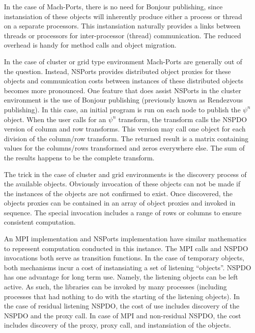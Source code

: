 \documentclass[11pt]{article}
\begin{document}
In the case of Mach-Ports, there is no need for Bonjour publishing, since instansiation of these objects will inherently produce either a process or thread on a separate processors.   This instansiation naturally provides a links between threads or processors for inter-processor (thread) communication.  The reduced overhead is handy for method calls and object migration.  

In the case of cluster or grid type environment Mach-Ports are generally out of the question.   Instead, NSPorts provides distributed object proxies for these objects and communication costs between instances of these distributed objects becomes more pronounced.  One feature that does assist NSPorts in the cluster environment is the use of Bonjour publishing (previously known as Rendezvous publishing).  In this case, an initial program is run on each node to publish the $\psi^n$ object.  When the user calls for an $\psi^n$ transform, the transform calls the NSPDO version of column and row transforms.  This version may call one object for each division of the column/row transform.  The returned result is a matrix containing values for the columns/rows transformed and zeros everywhere else.  The sum of the results happens to be the complete transform.  

The trick in the case of cluster and grid environments is the discovery process of the available objects.  Obviously invocation of these objects can not be made if the instances of the objects are not confirmed to exist.  Once discovered, the objects proxies can be contained in an array of object proxies and invoked in sequence.  The special invocation includes a range of rows or columns to ensure consistent computation. 
 
\begin{Large}
An MPI implementation and NSPorts implementation have similar mathematics to represent computation conducted in this instance.  The MPI calls and NSPDO invocations both serve as transition functions.  In the case of temporary objects, both mechanisms incur a cost of instansiating a set of listening ``objects''.   NSPDO has one advantage for long term use.  Namely, the listening objects can be left active.  As such, the libraries can be invoked by many processes (including processes that had nothing to do with the starting of the listening objects).   In the case of residual listening NSPDO, the cost of use includes discovery of the NSPDO and the proxy call.  In case of MPI and non-residual NSPDO, the cost includes discovery of the proxy, proxy call, and instansiation of the objects.   
\end{Large}
\end{document}
